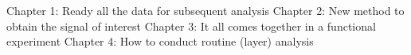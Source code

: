 


Chapter 1: Ready all the data for subsequent analysis
Chapter 2: New method to obtain the signal of interest
Chapter 3: It all comes together in a functional experiment
Chapter 4: How to conduct routine (layer) analysis

